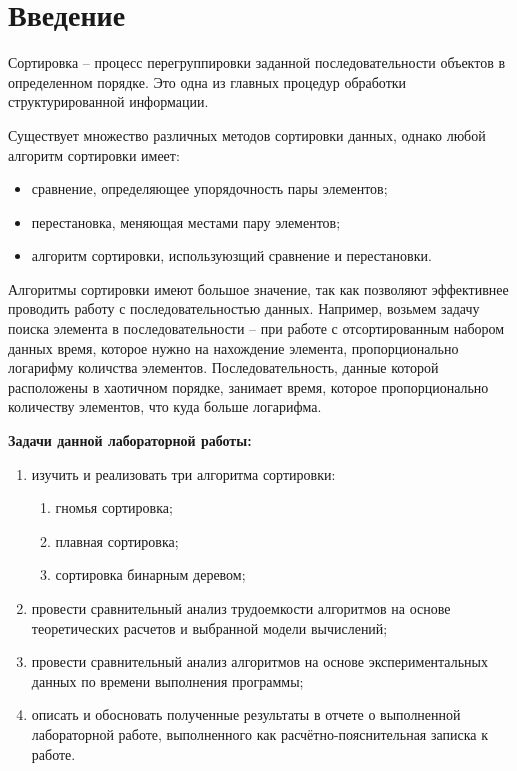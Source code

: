 \chapter*{Введение}

Сортировка -- процесс перегруппировки заданной последовательности объектов в определенном порядке. Это одна из главных процедур обработки структурированной информации.

Существует множество различных методов сортировки данных, однако любой алгоритм сортировки имеет:

\begin{itemize}
	\item сравнение, определяющее упорядочность пары элементов;
	\item перестановка, меняющая местами пару элементов;
	\item алгоритм сортировки, используюзщий сравнение и перестановки.
\end{itemize}

Алгоритмы сортировки имеют большое значение, так как позволяют эффективнее проводить работу с последовательностью данных. Например, возьмем задачу поиска элемента в последовательности -- при работе с отсортированным набором данных время, которое нужно на нахождение элемента, пропорционально логарифму количства элементов. Последовательность, данные которой расположены в хаотичном порядке, занимает время, которое пропорционально количеству элементов, что куда больше логарифма.

\bigskip

\textbf{Задачи данной лабораторной работы:}

\begin{enumerate}[label=\arabic*)]
	\item изучить и реализовать три алгоритма сортировки:
	\begin{enumerate}
		\item гномья сортировка; 
		\item плавная сортировка;
		\item сортировка бинарным деревом;
	\end{enumerate}
	\item провести сравнительный анализ трудоемкости алгоритмов на основе теоретических расчетов и выбранной модели вычислений;
	\item провести сравнительный анализ алгоритмов на основе экспериментальных данных по времени выполнения программы;
	\item описать и обосновать полученные результаты в отчете о выполненной лабораторной работе, выполненного как расчётно-пояснительная записка к работе.
\end{enumerate}
